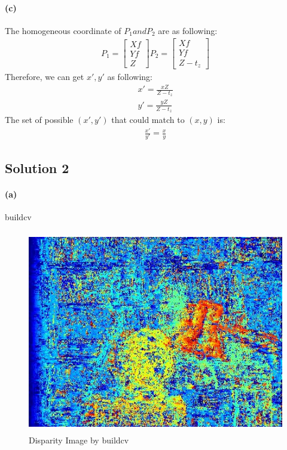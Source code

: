 \documentclass{article}
\newcommand{\solution}[1]{\clearpage \subsection*{Solution #1}}  %
\newcommand{\spart}[1]{\paragraph{(#1)}}
\begin{document}
\spart{c} 
The homogeneous coordinate of $P_1 and P_2$ are as following:
\begin{align}
	P_1 =  \left[
			\begin{array}{c}
			Xf\\
			Yf\\
			Z
			\end{array}
		\right]
	P_2 = \left[
			\begin{array}{c}
			Xf\\
			Yf\\
			Z-t_z
			\end{array}
		\right]
\end{align}
Therefore, we can get $x', y'$ as following:
\begin{align}
	x' = \frac{xZ}{Z-t_z} \\
	y' = \frac{yZ}{Z-t_z}
\end{align}
The set of possible $(x',y')$ that could match to $(x,y)$ is: 
\begin{align}
	\frac{x'}{y'} = \frac{x}{y} 
\end{align}

\solution{2}

\spart{a}
buildcv
\begin{figure}[h!]
  \centering
	\includegraphics[height=24em]{code/outputs/prob2a.jpg}
	  \caption{Disparity Image by buildcv}
\end{figure}
\end{document}
